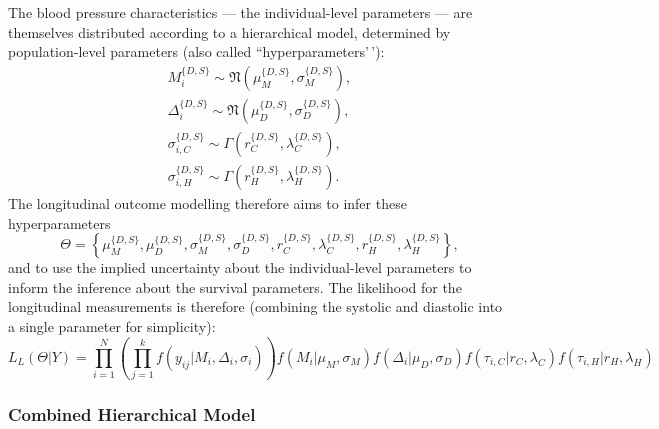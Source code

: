\documentclass[
]{article}
\begin{document}
The blood pressure characteristics --- the individual-level parameters
--- are themselves distributed according to a hierarchical model,
determined by population-level parameters (also called
``hyperparameters'\,'): \begin{equation}\label{priorsL}
\begin{aligned}
  M_i^{\{D,S\}}\sim \mathfrak{N}(\mu_M^{\{D,S\}},\sigma_M^{\{D,S\}}),\\
  \Delta_i^{\{D,S\}}\sim \mathfrak{N}(\mu_D^{\{D,S\}},\sigma_D^{\{D,S\}}),\\
  \sigma_{i,C}^{\{D,S\}}\sim \Gamma(r_C^{\{D,S\}},\lambda_C^{\{D,S\}}),\\
  \sigma_{i,H}^{\{D,S\}}\sim \Gamma(r_H^{\{D,S\}},\lambda_H^{\{D,S\}}).
\end{aligned}
\end{equation} The longitudinal outcome modelling therefore aims to
infer these hyperparameters \begin{equation}
  \Theta=\left\{\mu_M^{\{D,S\}},\mu_D^{\{D,S\}},\sigma_M^{\{D,S\}},\sigma_D^{\{D,S\}},r_C^{\{D,S\}},\lambda_C^{\{D,S\}},r_H^{\{D,S\}},\lambda_H^{\{D,S\}}\right\},
\end{equation} and to use the implied uncertainty about the
individual-level parameters to inform the inference about the survival
parameters. The likelihood for the longitudinal measurements is
therefore (combining the systolic and diastolic into a single parameter
for simplicity): \begin{equation}\label{likelong}
  L_L(\Theta|Y)=\prod_{i=1}^N\left(\prod_{j=1}^{k}f(y_{ij}|M_i,\Delta_i,\sigma_i)\right)f(M_i|\mu_M,\sigma_M)f(\Delta_i|\mu_D,\sigma_D)f(\tau_{i,C}|r_C,\lambda_C)f(\tau_{i,H}|r_H,\lambda_H)
\end{equation}

\hypertarget{combined-hierarchical-model}{%
\subsubsection{Combined Hierarchical
Model}\label{combined-hierarchical-model}}
\end{document}
